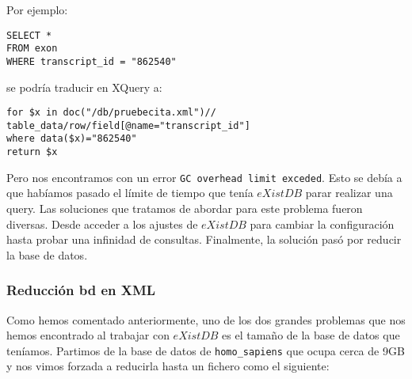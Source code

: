 \documentclass[12pt,a4paper]{article}
\begin{document}
Por ejemplo:

 \begin{verbatim}
SELECT *
FROM exon
WHERE transcript_id = "862540"
 \end{verbatim}
 
se podría traducir en XQuery a:

\begin{verbatim}
for $x in doc("/db/pruebecita.xml")//
table_data/row/field[@name="transcript_id"]
where data($x)="862540"
return $x
\end{verbatim}


Pero nos encontramos con un error \verb|GC overhead limit exceded|. Esto se debía a que habíamos pasado el límite de tiempo que tenía $eXistDB$ parar realizar una query. Las soluciones que tratamos de abordar para este problema fueron diversas. Desde acceder a los ajustes de $eXistDB$ para cambiar la configuración hasta probar una infinidad de consultas. Finalmente, la solución pasó por reducir la base de datos.





\subsubsection{Reducción bd en XML} \label{pto421}

Como hemos comentado anteriormente, uno de los dos grandes problemas que nos hemos encontrado al trabajar con $eXistDB$ es el tamaño de la base de datos que teníamos. Partimos de la base de datos de \verb|homo_sapiens| que ocupa cerca de 9GB y nos vimos forzada a reducirla hasta un fichero como el siguiente:
\end{document}
